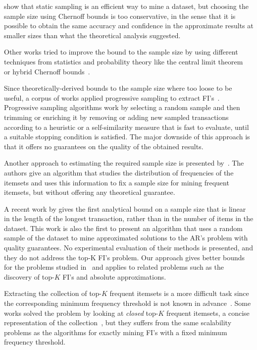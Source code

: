 \citet{ZakiPLO97} show that static sampling is an efficient way to
mine a dataset, but choosing the sample size using Chernoff bounds is too
conservative, in the sense that it is possible to obtain the same accuracy and
confidence in the approximate results at smaller sizes than what the theoretical
analysis suggested. 

Other works tried to improve the bound to the sample size by using different
techniques from statistics and probability theory like the central limit
theorem~\citep{ZhangZW03,LiG04,JiaL05} or hybrid Chernoff
bounds~\citep{ZhaoZZ06}.

Since theoretically-derived bounds to the sample size where too loose to be
useful, a corpus of works applied progressive sampling to extract
FI's~\citep{JohnL96,ChenHS02,Parthasarathy02,BronnimanCDHS03,ChuangCY05,JiaG05,WangDC05,HwangK06,HuY06,MahafzahABAZ09,ChenHH11,ChandraB11}.
Progressive sampling algorithms work by selecting a random sample and then
trimming or enriching it by removing or adding new sampled transactions
according to a heuristic or a self-similarity measure that is fast to evaluate,
until a suitable stopping condition is satisfied. The major downside of this
approach is that it offers no guarantees on the quality of the obtained results.

Another approach to estimating the required sample size is presented
by~\citet{ChuangHC08}. The authors give an algorithm that studies the
distribution of frequencies of the itemsets and uses this information to fix a
sample size for mining frequent itemsets, but without offering any theoretical
guarantee.

A recent work by \citet{ChakaravarthyPS09} gives the first
analytical bound on a sample size that is linear in the length of the longest
transaction, rather than in the number of items in the dataset.  This work is
also the first to present an algorithm that uses a random sample of the dataset
to mine approximated solutions to the AR's problem with quality guarantees. No
experimental evaluation of their methods is presented, and they do not address
the top-K FI's problem. Our approach gives better bounds for the problems
studied in~\citep{ChakaravarthyPS09} and applies to related problems such as the
discovery of top-$K$ FI's and absolute approximations.

Extracting the collection of top-$K$ frequent itemsets is a more difficult task
since the corresponding minimum frequency threshold is not known in
advance~\citep{CheungF04,FuKT00}. Some works solved the problem by looking at
\emph{closed} top-$K$ frequent itemsets, a concise representation of the
collection~\citep{WangHLT05,PietracaprinaV07}, but they suffers from the same
scalability problems as the algorithms for exactly mining FI's with a fixed
minimum frequency threshold.

